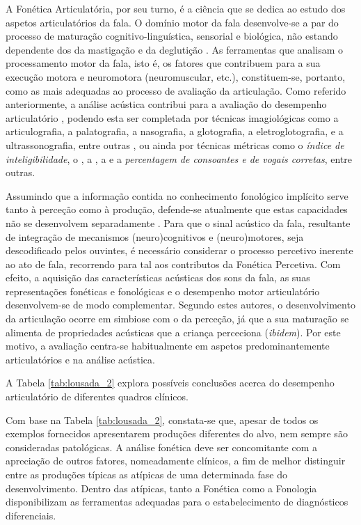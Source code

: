 \documentclass[output=paper]{LSP/langsci}
\begin{document}
A Fonética Articulatória, por seu turno, é a ciência que se dedica ao estudo dos aspetos articulatórios da fala. O domínio motor da fala desenvolve-se a par do processo de maturação cognitivo-linguística, sensorial e biológica, não estando dependente dos da mastigação e da deglutição \citep{kent2000}. As ferramentas que analisam o processamento motor da fala, isto é, os fatores que contribuem para a sua execução motora e neuromotora (neuromuscular, etc.), constituem-se, portanto, como as mais adequadas ao processo de avaliação da articulação. Como referido anteriormente, a análise acústica contribui para a avaliação do desempenho articulatório \citep{rielysmith2003}, podendo esta ser completada por técnicas imagiológicas como a articulografia, a palatografia, a nasografia, a glotografia, a eletroglotografia, e a ultrassonografia, entre outras \citep{berti2013,llisterri2014}, ou ainda por técnicas métricas como o \textit{índice de inteligibilidade}, o \textit{}, a \textit{}, a \textit{} e a \textit{percentagem de consoantes e de vogais corretas}, entre outras.

Assumindo que a informação contida no conhecimento fonológico implícito serve tanto à perceção como à produção, defende-se atualmente que estas capacidades não se desenvolvem separadamente \citep{kent2000,peperkampdupoux2002,smith2006,smith2010}. Para que o sinal acústico da fala, resultante de integração de mecanismos (neuro)cognitivos e (neuro)motores, seja descodificado pelos ouvintes, é necessário considerar o processo percetivo inerente ao ato de fala, recorrendo para tal aos contributos da Fonética Percetiva.  Com efeito, a aquisição das características acústicas dos sons da fala, as suas representações fonéticas e fonológicas e o desempenho motor articulatório desenvolvem-se de modo complementar. Segundo estes autores, o desenvolvimento da articulação ocorre em simbiose com o da perceção, já que a sua maturação se alimenta de propriedades acústicas que a criança perceciona (\textit{ibidem}). Por este motivo, a avaliação centra-se habitualmente em aspetos predominantemente articulatórios e na análise acústica. 

A Tabela \ref{tab:lousada_2} explora possíveis conclusões acerca do desempenho articulatório de diferentes quadros clínicos.

Com base na Tabela \ref{tab:lousada_2}, constata-se que, apesar de todos os exemplos fornecidos apresentarem produções diferentes do alvo, nem sempre são consideradas patológicas. A análise fonética deve ser concomitante com a apreciação de outros fatores, nomeadamente clínicos, a fim de melhor distinguir entre as produções típicas as atípicas de uma determinada fase do desenvolvimento. Dentro das atípicas, tanto a Fonética como a Fonologia disponibilizam as ferramentas adequadas para o estabelecimento de diagnósticos diferenciais.
\end{document}
